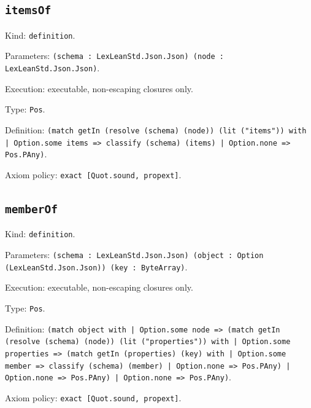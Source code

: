 \documentclass[11pt]{article}
\begin{document}
\subsection*{\texttt{itemsOf}}
\noindent Kind: \texttt{definition}.\par
\noindent Parameters: \texttt{(schema : LexLeanStd.Json.Json) (node : LexLeanStd.Json.Json)}.\par
\noindent Execution: executable, non-escaping closures only.\par
\noindent Type: \texttt{Pos}.\par
\noindent Definition: \texttt{(match getIn (resolve (schema) (node)) (lit ("items")) with | Option.some items => classify (schema) (items) | Option.none => Pos.PAny)}.\par
\noindent Axiom policy: \texttt{exact [Quot.sound, propext]}.\par
\subsection*{\texttt{memberOf}}
\noindent Kind: \texttt{definition}.\par
\noindent Parameters: \texttt{(schema : LexLeanStd.Json.Json) (object : Option (LexLeanStd.Json.Json)) (key : ByteArray)}.\par
\noindent Execution: executable, non-escaping closures only.\par
\noindent Type: \texttt{Pos}.\par
\noindent Definition: \texttt{(match object with | Option.some node => (match getIn (resolve (schema) (node)) (lit ("properties")) with | Option.some properties => (match getIn (properties) (key) with | Option.some member => classify (schema) (member) | Option.none => Pos.PAny) | Option.none => Pos.PAny) | Option.none => Pos.PAny)}.\par
\noindent Axiom policy: \texttt{exact [Quot.sound, propext]}.\par
\end{document}

